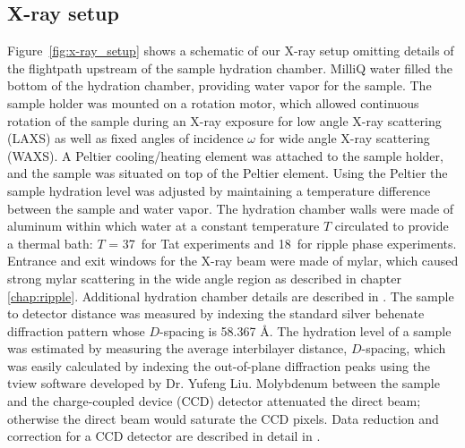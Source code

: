 \subsection{X-ray setup}
Figure~\ref{fig:x-ray_setup} shows a schematic of our X-ray setup
omitting details of the flightpath upstream of the 
sample hydration chamber.
MilliQ water filled the bottom of the hydration chamber, providing
water vapor for the sample.
The sample holder was mounted on a rotation motor, which allowed continuous 
rotation of the sample during an X-ray exposure for low angle X-ray scattering
(LAXS) as well as fixed angles of incidence $\omega$ for wide angle X-ray 
scattering (WAXS).
A Peltier cooling/heating element was attached to the sample holder, and
the sample was situated on top of the Peltier element. 
Using the Peltier the sample hydration level was adjusted by maintaining
a temperature difference between the sample and water vapor. 
The hydration chamber walls were made of aluminum within which
water at a constant temperature $T$ circulated to provide a thermal bath:
$T$ = 37\textdegree\ for Tat experiments and 18\textdegree\ for ripple phase 
experiments.
Entrance and exit windows for the X-ray beam were made of mylar, which
caused strong mylar scattering in the wide angle region as described in
chapter \ref{chap:ripple}.
Additional hydration chamber details are described in \cite{Kucerka05_BPJ}.
The sample to detector distance was measured by indexing the standard 
silver behenate diffraction pattern whose $D$-spacing is 58.367 \AA.
The hydration level of a sample was estimated by measuring the average 
interbilayer distance, $D$-spacing, which was easily calculated by indexing the 
out-of-plane diffraction peaks using the tview software developed by Dr. Yufeng Liu.
Molybdenum between the sample and the charge-coupled device (CCD) detector
attenuated the direct beam; otherwise the direct beam would saturate 
the CCD pixels. 
Data reduction and correction for a CCD 
detector are described in detail in \cite{Barna99}.

